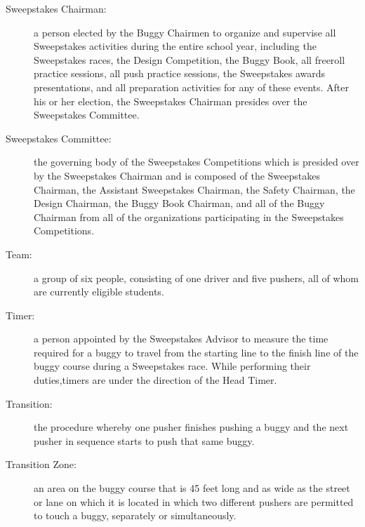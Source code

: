 \begin{description}
	\item[Sweepstakes Chairman:]
	a person elected by the Buggy Chairmen to organize and supervise all Sweepstakes activities during the entire school year, including the Sweepstakes races, the Design Competition, the Buggy Book, all freeroll practice sessions, all push practice sessions, the Sweepstakes awards presentations, and all preparation activities for any of these events. After his or her election, the Sweepstakes Chairman presides over the Sweepstakes Committee.

	\item[Sweepstakes Committee:]
	the governing body of the Sweepstakes Competitions which is presided over by the Sweepstakes Chairman and is composed of the Sweepstakes Chairman, the Assistant Sweepstakes Chairman, the Safety Chairman, the Design Chairman, the Buggy Book Chairman, and all of the Buggy Chairman from all of the organizations participating in the Sweepstakes Competitions.

	\item[Team:]
	a group of six people, consisting of one driver and five pushers, all of whom are currently eligible students.

	\item[Timer:]
	a person appointed by the Sweepstakes Advisor to measure the time required for a buggy to travel from the starting line to the finish line of the buggy course during a Sweepstakes race. While performing their duties,timers are under the direction of the Head Timer.

	\item[Transition:]
	the procedure whereby one pusher finishes pushing a buggy and the next pusher in sequence starts to push that same buggy.

	\item[Transition Zone:]
	an area on the buggy course that is 45 feet long and as wide as the street or lane on which it is located in which two different pushers are permitted to touch a buggy, separately or simultaneously.

\end{description}

